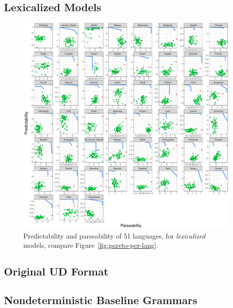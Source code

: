 \documentclass[10pt,twoside,lineno]{article}
\begin{document}
\subsection{Lexicalized Models}

\begin{figure}
\centering
\includegraphics[width=\textwidth]{../results/plane/unlexicalized/pareto-plane-perLanguage-lexicalized.pdf}
	\caption[Predictability and Parseability]{Predictability and parseability of 51 languages, for \emph{lexicalized} models, compare Figure~\ref{fig:pareto-per-lang}.}
\end{figure}

\subsection{Original UD Format}

\subsection{Nondeterministic Baseline Grammars}





%
\end{document}
